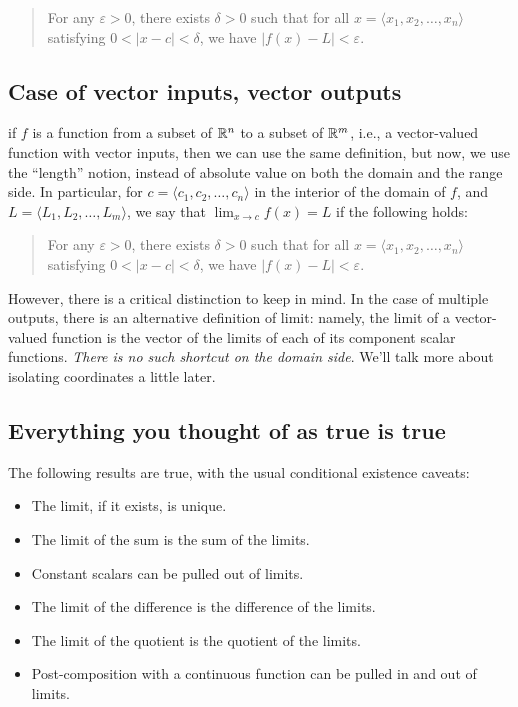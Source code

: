 \documentclass[10pt]{amsart}
\begin{document}
\begin{quote}
  For any $\varepsilon > 0$, there exists $\delta > 0$ such that for all
  $x = \langle x_1,x_2,\dots,x_n \rangle$ satisfying $0 < |x - c| <
  \delta$, we have $|f(x) - L| < \varepsilon$.
\end{quote}

\subsection{Case of vector inputs, vector outputs}

if $f$ is a function from a subset of $\mathbb{R}^n$ to a subset of $\mathbb{R}^m$,
i.e., a vector-valued function with vector inputs, then we can use the
same definition, but now, we use the ``length'' notion, instead of
absolute value on both the domain and the range side. In particular,
for $c = \langle c_1, c_2, \dots, c_n \rangle$ in the interior of the
domain of $f$, and $L = \langle L_1, L_2, \dots, L_m \rangle$, we say
that $\lim_{x \to c} f(x) = L$ if the following holds:

\begin{quote}
  For any $\varepsilon > 0$, there exists $\delta > 0$ such that for all
  $x = \langle x_1,x_2,\dots,x_n \rangle$ satisfying $0 < |x - c| <
  \delta$, we have $|f(x) - L| < \varepsilon$.
\end{quote}

However, there is a critical distinction to keep in mind. In the case
of multiple outputs, there is an alternative definition of limit:
namely, the limit of a vector-valued function is the vector of the
limits of each of its component scalar functions. {\em There is no
such shortcut on the domain side}. We'll talk more about isolating
coordinates a little later.

\subsection{Everything you thought of as true is true}

The following results are true, with the usual conditional existence caveats:

\begin{itemize}
\item The limit, if it exists, is unique.
\item The limit of the sum is the sum of the limits.
\item Constant scalars can be pulled out of limits.
\item The limit of the difference is the difference of the limits.
\item The limit of the quotient is the quotient of the limits.
\item Post-composition with a continuous function can be pulled in and
  out of limits.
\end{itemize}
\end{document}
